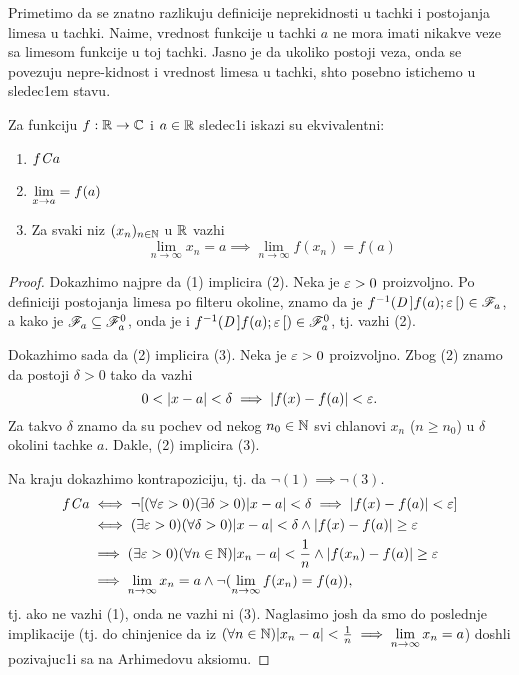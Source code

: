 \documentclass[../main_og.tex]{subfiles}
\begin{document}
    Primetimo da se znatno razlikuju definicije neprekidnosti u tachki i postojanja limesa u tachki. Naime, vrednost funkcije u tachki $a$ ne mora imati nikakve veze sa limesom funkcije u toj tachki. Jasno je da ukoliko postoji veza, onda se povezuju nepre-kidnost i vrednost limesa u tachki, shto posebno istichemo u sledec1em stavu.
    \begin{st}
     Za funkciju $f:\mathbb{R} \to \mathbb{C}$ i $a\in \mathbb{R}$ sledec1i iskazi su ekvivalentni:
\begin{enumerate}
    \item $f\mathit{C} a$
    \item $\displaystyle{\lim_{x \to a}=f(a)}$
    \item Za svaki niz $(x_n)_{n\in \mathbb{N}}$ u $\mathbb{R}$ vazhi \[\lim_{n \to \infty}x_n=a \implies \lim_{n \to \infty}f(x_n)=f(a) \]
\end{enumerate}
        \end{st}
    \begin{proof}
        Dokazhimo najpre da (1) implicira (2). Neka je $\varepsilon>0$ proizvoljno.
	Po definiciji postojanja limesa po filteru okoline, znamo da je $f^{-1}(\mathit{D}\,]f(a);\varepsilon\,[) \in \mathscr{F}_a$,
	a kako je $\mathscr{F}_a\subseteq \mathscr{F}_a^0$, onda je i  $f^{-1}(\mathit{D}\,]f(a);\varepsilon\,[) \in \mathscr{F}_a^0$, tj. vazhi (2).

        Dokazhimo sada da (2) implicira (3). Neka je $\varepsilon>0$ proizvoljno.
	Zbog (2) znamo da postoji $\delta>0$ tako da vazhi $$0<|x-a|<\delta\implies |f(x)-f(a)|<\eps.$$ 
	Za takvo $\delta$ znamo da su pochev od nekog $n_0 \in \mathbb{N}$ svi chlanovi $x_n$ ($n\geq n_0$) u $\delta$ okolini tachke $a$. Dakle, (2) implicira (3).

        Na kraju dokazhimo kontrapoziciju, tj. da $\neg(1)\implies\neg(3)$. 
        \begin{align*}
            f\mathit{C} a &\iff \neg[(\forall \varepsilon >0)(\exists \delta > 0)|x-a|<\delta \implies |f(x)-f(a)|<\varepsilon]\\
                      &\iff (\exists \varepsilon >0)(\forall \delta > 0)|x-a|<\delta \land |f(x)-f(a)|\geq\varepsilon\\
                      &\implies (\exists \varepsilon >0)(\forall n \in \mathbb{N})|x_n-a|<\frac{1}{n} \land |f(x_n)-f(a)|\geq\varepsilon\\
                      &\implies \lim_{n\to\infty}x_n=a \land \neg(\lim_{n\to\infty}f(x_n)=f(a)),
        \end{align*}
        tj. ako ne vazhi (1), onda ne vazhi ni (3). Naglasimo josh da smo do poslednje implikacije
	(tj. do chinjenice da iz $(\forall n \in \mathbb{N})|x_n-a|<\frac{1}{n} \implies \displaystyle{\lim_{n\to \infty}x_n=a}$) doshli pozivajuc1i sa na Arhimedovu aksiomu.
    \end{proof} 
    
\end{document}
